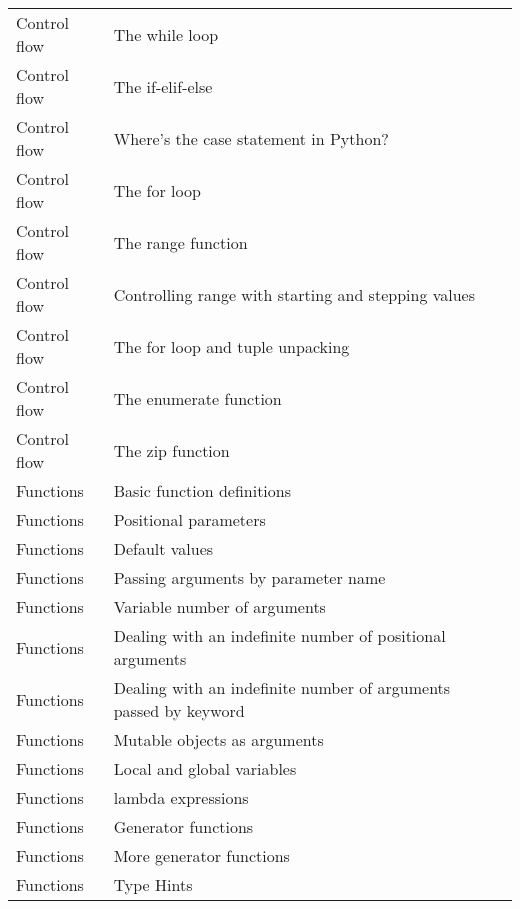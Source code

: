 \documentclass[10pt,a4paper]{article}
\begin{document}
\begin{landscape}
\begin{longtable}{|l|l|l|}
Control flow & The while loop & \cite{ceder2018quick} \\
    Control flow & The if-elif-else & \cite{ceder2018quick} \\
    Control flow & Where's the case statement in Python? & \cite{ceder2018quick} \\
    Control flow & The for loop & \cite{ceder2018quick} \\
    Control flow & The range function & \cite{ceder2018quick} \\
    Control flow & Controlling range with starting and stepping values & \cite{ceder2018quick} \\
    Control flow & The for loop and tuple unpacking & \cite{ceder2018quick} \\
    Control flow & The enumerate function & \cite{ceder2018quick} \\
    Control flow & The zip function & \cite{ceder2018quick} \\
    
Functions & Basic function definitions & \cite{ceder2018quick} \\
    Functions & Positional parameters & \cite{ceder2018quick} \\
    Functions & Default values & \cite{ceder2018quick} \\
    Functions & Passing arguments by parameter name & \cite{ceder2018quick} \\
    Functions & Variable number of arguments & \cite{ceder2018quick} \\
    Functions & Dealing with an indefinite number of positional arguments & \cite{ceder2018quick} \\
    Functions & Dealing with an indefinite number of arguments passed by keyword & \cite{ceder2018quick} \\
    Functions & Mutable objects as arguments & \cite{ceder2018quick} \\
    Functions & Local and global variables & \cite{ceder2018quick} \\
    Functions & lambda expressions & \cite{ceder2018quick} \\
    Functions & Generator functions & \cite{ceder2018quick} \\
    Functions & More generator functions & \cite{danjou2018serious} \\
    Functions & Type Hints & \cite{sweigart2020beyond} \\
    

\end{longtable}
\end{landscape}
\end{document}
